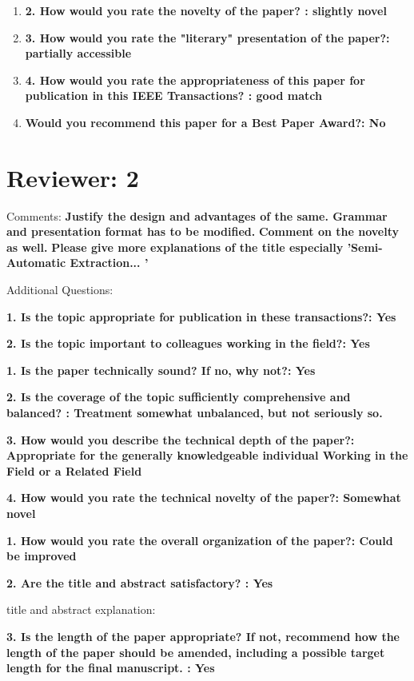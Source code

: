 \documentclass[12pt]{article}
\begin{document}
\begin{enumerate}
\item \textbf{2. How would you rate the novelty of the paper? : slightly novel}

\item \textbf{3. How would you rate the "literary" presentation of the paper?: partially 
accessible}

\item \textbf{4. How would you rate the appropriateness of this paper for publication in 
this IEEE Transactions? : good match}

\item \textbf{Would you recommend this paper for a Best Paper Award?: No}

\end{enumerate}


\section*{Reviewer: 2}

Comments:
\textbf{Justify the design and advantages of the same. Grammar and presentation format has to be modified.}
\textbf{Comment on the novelty as well.}
\textbf{Please give more explanations of the title especially 'Semi-Automatic Extraction... '}

Additional Questions:

\textbf{1. Is the topic appropriate for publication in these transactions?: Yes}

\textbf{2. Is the topic important to colleagues working in the field?: Yes}

\textbf{1. Is the paper technically sound? If no, why not?: Yes}


\textbf{2. Is the coverage of the topic sufficiently comprehensive and balanced? : Treatment somewhat unbalanced, but not seriously so.}

\textbf{3. How would you describe the technical depth of the paper?: Appropriate for the generally knowledgeable individual Working in the Field or a Related Field}

\textbf{4. How would you rate the technical novelty of the paper?: Somewhat novel}

\textbf{1. How would you rate the overall organization of the paper?: Could be improved}

\textbf{2. Are the title and abstract satisfactory? : Yes}

title and abstract explanation:

\textbf{3. Is the length of the paper appropriate? If not, recommend how the length of the paper should be amended, including a possible target length for the final manuscript. : Yes}
\end{document}

